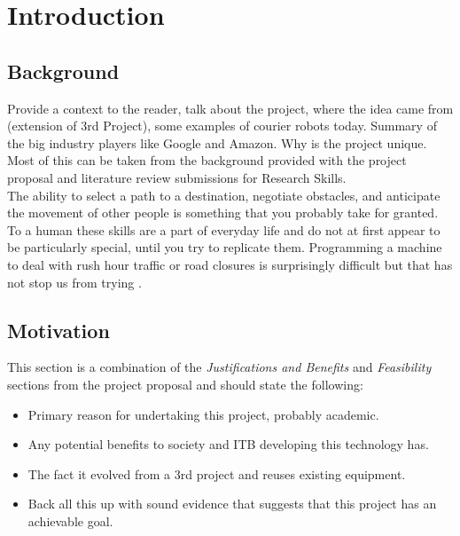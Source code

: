 \chapter{Introduction}


\section{Background}

\noindent
Provide a context to the reader, talk about the project, where the idea came from (extension of 3rd Project), some examples of courier robots today. Summary of the big industry players like Google and Amazon. Why is the project unique. Most of this can be taken from the background provided with the project proposal and literature review submissions for Research Skills.\\

\noindent
The ability to select a path to a destination, negotiate obstacles, and anticipate the movement of other people is something that you probably take for granted. To a human these skills are a part of everyday life and do not at first appear to be particularly special, until you try to replicate them. Programming a machine to deal with rush hour traffic or road closures is surprisingly difficult but that has not stop us from trying \cite{MIT}.\\


\section{Motivation}

\noindent
This section is a combination of the \textit{Justifications and Benefits} and \textit{Feasibility} sections from the project proposal and should state the following:

\begin{itemize}
\item Primary reason for undertaking this project, probably academic.
\item Any potential benefits to society and ITB developing this technology has.
\item The fact it evolved from a 3rd project and reuses existing equipment.
\item Back all this up with sound evidence that suggests that this project has an achievable goal.
\end{itemize} 

